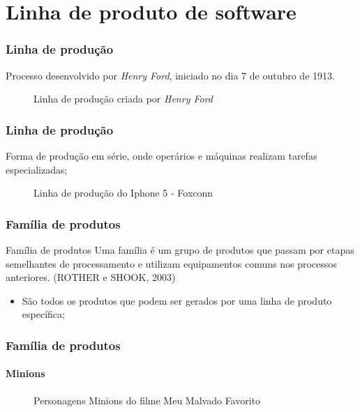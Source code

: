 \section{Linha de produto de software}

\begin{frame}
\frametitle{Linha de produção}

Processo desenvolvido por \textit{Henry Ford}, iniciado no dia 7 de outubro de 1913.

\begin{figure}
\caption{Linha de produção criada por \textit{Henry Ford}}
\end{figure}

\end{frame}

\begin{frame}
\frametitle{Linha de produção}

Forma de produção em série, onde operários e máquinas realizam tarefas especializadas;

\begin{figure}
\caption{Linha de produção do Iphone 5 - Foxconn}
\end{figure}

\end{frame}

\begin{frame}
\frametitle{Família de produtos}

\begin{block}{Família de produtos}
  Uma família é um grupo de produtos que passam por etapas semelhantes de processamento e utilizam equipamentos comuns nos processos anteriores. (ROTHER e SHOOK, 2003)
\end{block}

\begin{itemize}
 \item {
   São todos os produtos que podem ser gerados por uma linha de produto específica;
 }
\end{itemize}

\end{frame}

\begin{frame}
\frametitle{Família de produtos}
\framesubtitle{Minions}

\begin{figure}
\caption{Personagens Minions do filme Meu Malvado Favorito}
\end{figure}

\end{frame}

